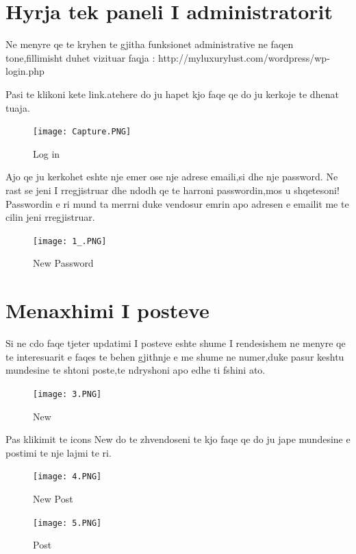 \section{Hyrja tek paneli I administratorit}
Ne menyre qe te kryhen te gjitha funksionet administrative ne faqen tone,fillimisht duhet vizituar faqja :
http://myluxurylust.com/wordpress/wp-login.php

Pasi te klikoni kete link.atehere do ju hapet kjo faqe qe do ju kerkoje te dhenat tuaja.
\begin{figure}[!h]
  \texttt{[image: Capture.PNG]}
  \caption{Log in}
  \label{fig:Log in}
\end{figure}

Ajo qe ju kerkohet eshte nje emer ose nje adrese emaili,si dhe nje password.
Ne rast se jeni I rregjistruar dhe ndodh qe te harroni passwordin,mos u shqetesoni!
Passwordin e ri mund ta merrni duke vendosur emrin apo adresen e emailit me te cilin jeni rregjistruar.

\begin{figure}[!h]
  \texttt{[image: 1\_.PNG]}
  \caption{New Password}
  \label{fig:New Password}
\end{figure}

\section{Menaxhimi I posteve}
Si ne cdo faqe tjeter updatimi I posteve eshte shume I rendesishem ne menyre qe te interesuarit e faqes te behen gjithnje e me shume ne numer,duke pasur keshtu mundesine te shtoni poste,te ndryshoni apo edhe ti fshini ato.

\begin{figure}[!h]
  \texttt{[image: 3.PNG]}
  \caption{New}
  \label{fig:New}
\end{figure}
Pas klikimit te icons New do te zhvendoseni te kjo faqe qe do ju jape mundesine e postimi te nje lajmi te ri.

\begin{figure}[!h]
  \texttt{[image: 4.PNG]}
  \caption{New Post}
  \label{fig:New Post}
\end{figure}

\begin{figure}[!h]
  \texttt{[image: 5.PNG]}
  \caption{Post}
  \label{fig:New}
\end{figure}

